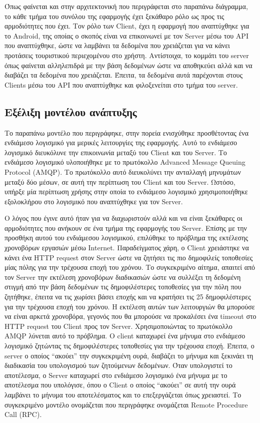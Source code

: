\documentclass[oneside, 12pt]{book}
\begin{document}
Όπως φαίνεται και στην αρχιτεκτονική που περιγράφεται στο παραπάνω 
διάγραμμα, το κάθε τμήμα του συνόλου της εφαρμογής έχει ξεκάθαρο ρόλο ως προς τις αρμοδιότητες που έχει. Τον ρόλο των Client, έχει η εφαρμογή που αναπτύχθηκε για το Android, της οποίας ο σκοπός είναι να επικοινωνεί με τον Server μέσω του API που αναπτύχθηκε, ώστε να λαμβάνει τα δεδομένα που χρειάζεται για να κάνει προτάσεις τουριστικού περιεχομένου στο χρήστη.
Αντίστοιχα, το κομμάτι του server όπως φαίνεται αλληλεπιδρά με την βάση δεδομένων ώστε να αποθηκεύει αλλά και να διαβάζει τα δεδομένα που χρειάζεται. Έπειτα, τα δεδομένα αυτά παρέχονται στους Clients μέσω του API που αναπτύχθηκε και φιλοξενείται στο τμήμα του server.

\subsection{Εξέλιξη μοντέλου ανάπτυξης}
Το παραπάνω μοντέλο που περιγράφηκε, στην πορεία ενισχύθηκε προσθέτοντας ένα ενδιάμεσο λογισμικό για μερικές λειτουργίες της εφαρμογής. Αυτό το ενδιάμεσο λογισμικό διευκόλυνε την επικοινωνία μεταξύ του Client και του Server. Το ενδιάμεσο λογισμικό υλοποιήθηκε με το πρωτόκολλο Advanced Message Queuing Protocol (AMQP). Το πρωτόκολλο αυτό διευκολύνει την ανταλλαγή μηνυμάτων μεταξύ δύο μέσων, σε αυτή την περίπτωση του Client και του Server. Ωστόσο, υπήρξε μία περίπτωση χρήσης στην οποία το ενδιάμεσο λογισμικό χρησιμοποιήθηκε εξολοκλήρου στο λογισμικό που αναπτύχθηκε για τον Server. 

Ο λόγος που έγινε αυτό ήταν για να διαχωριστούν αλλά και να είναι ξεκάθαρες οι αρμοδιότητες που ανήκουν σε ένα τμήμα της εφαρμογής του Server. Επίσης με την προσθήκη αυτού του ενδιάμεσου λογισμικού, επιλύθηκε το πρόβλημα της εκτέλεσης χρονοβόρων εργασιών μέσω Internet. Παραδείγματος χάρη, ο Client χρειάστηκε να κάνει ένα HTTP request στον Server ώστε να ζητήσει τις πιο δημοφιλείς τοποθεσίες μίας πόλης για την τρέχουσα εποχή του χρόνου. Το συγκεκριμένο αίτημα, απαιτεί από τον Server την εκτέλεση χρονοβόρων διαδικασιών ώστε να συλλέξει τη δεδομένη στιγμή από την βάση δεδομένων τις δημοφιλέστερες τοποθεσίες για την πόλη που ζητήθηκε, έπειτα να τις χωρίσει βάσει εποχής και να κρατήσει τις 25 δημοφιλέστερες για την τρέχουσα εποχή του χρόνου. Η εκτέλεση αυτών των λειτουργιών θα μπορούσε να είναι αρκετά χρονοβόρα, γεγονός που θα μπορούσε να προκαλέσει ένα timeout στο HTTP request του Client προς τον Server. Χρησιμοποιώντας το πρωτόκολλο AMQP λύνεται αυτό το πρόβλημα. Ο client καταχωρεί ένα μήνυμα στο ενδιάμεσο λογισμικό ζητώντας τις δημοφιλέστερες τοποθεσίες για την τρέχουσα εποχή. Έπειτα, ο server ο οποίος ``ακούει'' την συγκεκριμένη ουρά, διαβάζει το μήνυμα και ξεκινάει τη διαδικασία του υπολογισμού των ζητούμενων δεδομένων. Όταν υπολογιστεί το αποτέλεσμα, ο Server καταχωρεί στο ενδιάμεσο λογισμικό ένα μήνυμα με το αποτέλεσμα που υπολόγισε, όπου ο Client ο οποίος ``ακούει'' σε αυτή την ουρά λαμβάνει το μήνυμα του αποτελέσματος και το επεξεργάζεται όπως χρειαστεί. Το συγκεκριμένο μοντέλο ονομάζεται που περιγράφηκε ονομάζεται Remote Procedure Call (RPC).
\end{document}
